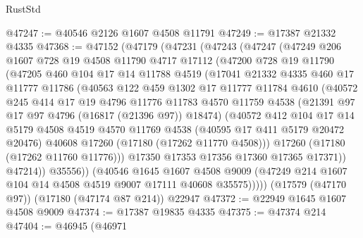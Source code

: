 \begin{lexlean}{RustStd}
\begin{coremodule}
{\begin{coremodule}
{{{{{{{{{{{{{{{{{{{{{{{{{{{{{{{{{{{{{{{{{{{{{{{{{{{{{{{@47247 := @40546 @2126 @1607 @4508 @11791
@47249 := @17387 @21332 @4335
@47368 := @47152
    (@47179
      (@47231
        (@47243
          (@47247
            (@47249
              @206
              @1607
              @728
              @19
              @4508
              @11790
              @4717
              @17112
              (@47200
                @728
                @19
                @11790
                (@47205
                  @460
                  @104
                  @17
                  @14
                  @11788
                  @4519
                  (@17041
                    @21332
                    @4335
                    @460
                    @17
                    @11777
                    @11786
                    (@40563
                      @122
                      @459
                      @1302
                      @17
                      @11777
                      @11784
                      @4610
                      (@40572
                        @245
                        @414
                        @17
                        @19
                        @4796
                        @11776
                        @11783
                        @4570
                        @11759
                        @4538
                        (@21391 @97 @17 @97 @4796 (@16817 (@21396 @97)) @18474)
                        (@40572
                          @412
                          @104
                          @17
                          @14
                          @5179
                          @4508
                          @4519
                          @4570
                          @11769
                          @4538
                          (@40595 @17 @411 @5179 @20472 @20476)
                          @40608
                          @17260
                          (@17180 (@17262 @11770 @4508)))
                        @17260
                        (@17180 (@17262 @11760 @11776)))
                      @17350
                      @17353
                      @17356
                      @17360
                      @17365
                      @17371))
                  @47214))
              @35556))
          (@40546
            @1645
            @1607
            @4508
            @9009
            (@47249 @214 @1607 @104 @14 @4508 @4519 @9007 @17111 @40608 @35575)))))
    (@17579 (@47170 @97))
    (@17180 (@47174 @87 @214))
    @22947
@47372 := @22949 @1645 @1607 @4508 @9009
@47374 := @17387 @19835 @4335
@47375 := @47374 @214
@47404 := @46945
    (@46971
}}}}}}}}}}}}}}}}}}}}}}}}}}}}}}}}}}}}}}}}}}}}}}}}}}}}}}}
\end{coremodule}}
\end{coremodule}
\end{lexlean}
